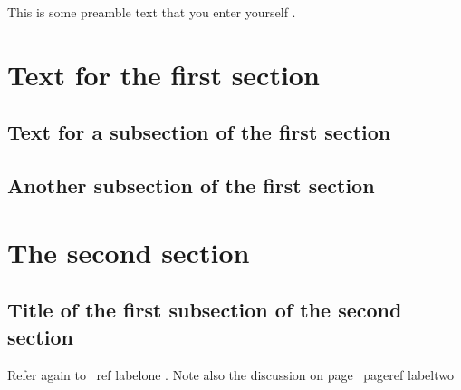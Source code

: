 \documentclass{article}
\begin{document}
This is some preamble text that you enter yourself .
%
\section { Text for the first section }
\lipsum [1]
\subsection { Text for a subsection of the first section }
\lipsum [2 -3]
\subsection { Another subsection of the first section }
\label{labelone}

\lipsum [4 -5]
\section { The second section }
\label{labeltwo}

\lipsum [6]
\subsection { Title of the first subsection of the second section }
Refer again to \ ref { labelone }.
Note also the discussion on page \ pageref { labeltwo }

\lipsum [7]
\end{document}
